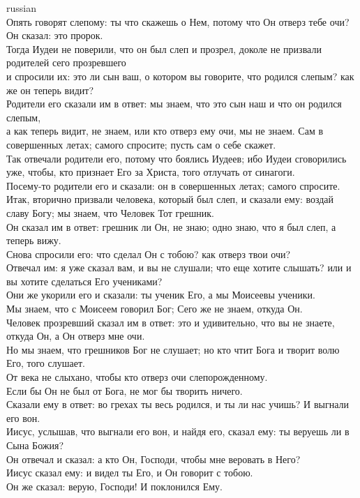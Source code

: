 \documentclass[10pt]{article} %
\begin{document}
{\begin{minipage}[t]{0.48\textwidth}
\begin{otherlanguage*}{russian}
\\
Опять говорят слепому: ты что скажешь о Нем, потому что Он отверз тебе очи? Он сказал: это пророк.
\\
Тогда Иудеи не поверили, что он был слеп и прозрел, доколе не призвали родителей сего прозревшего
\\
и спросили их: это ли сын ваш, о котором вы говорите, что родился слепым? как же он теперь видит?
\\
Родители его сказали им в ответ: мы знаем, что это сын наш и что он родился слепым,
\\
а как теперь видит, не знаем, или кто отверз ему очи, мы не знаем. Сам в совершенных летах; самого спросите; пусть сам о себе скажет.
\\
Так отвечали родители его, потому что боялись Иудеев; ибо Иудеи сговорились уже, чтобы, кто признает Его за Христа, того отлучать от синагоги.
\\
Посему-то родители его и сказали: он в совершенных летах; самого спросите.
\\
Итак, вторично призвали человека, который был слеп, и сказали ему: воздай славу Богу; мы знаем, что Человек Тот грешник.
\\
Он сказал им в ответ: грешник ли Он, не знаю; одно знаю, что я был слеп, а теперь вижу.
\\
Снова спросили его: что сделал Он с тобою? как отверз твои очи?
\\
Отвечал им: я уже сказал вам, и вы не слушали; что еще хотите слышать? или и вы хотите сделаться Его учениками?
\\
Они же укорили его и сказали: ты ученик Его, а мы Моисеевы ученики.
\\
Мы знаем, что с Моисеем говорил Бог; Сего же не знаем, откуда Он.
\\
Человек прозревший сказал им в ответ: это и удивительно, что вы не знаете, откуда Он, а Он отверз мне очи.
\\
Но мы знаем, что грешников Бог не слушает; но кто чтит Бога и творит волю Его, того слушает.
\\
От века не слыхано, чтобы кто отверз очи слепорожденному.
\\
Если бы Он не был от Бога, не мог бы творить ничего.
\\
Сказали ему в ответ: во грехах ты весь родился, и ты ли нас учишь? И выгнали его вон.
\\
Иисус, услышав, что выгнали его вон, и найдя его, сказал ему: ты веруешь ли в Сына Божия?
\\
Он отвечал и сказал: а кто Он, Господи, чтобы мне веровать в Него?
\\
Иисус сказал ему: и видел ты Его, и Он говорит с тобою.
\\
Он же сказал: верую, Господи! И поклонился Ему.
\\


\end{otherlanguage*}
\end{minipage}}
\end{document}

